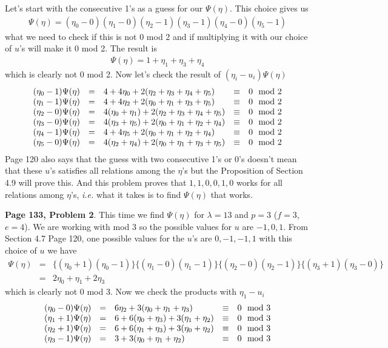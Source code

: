 \documentclass[aps,preprint,preprintnumbers,nofootinbib,showpacs,prd]{revtex4-1}
\newcommand{\ie}{{\it i.e.} }
\newcommand{\nbea}{\begin{eqnarray*}}
\newcommand{\neea}{\end{eqnarray*}}
\begin{document}
Let's start with the consecutive 1's as a guess for our $\Psi(\eta)$. This choice gives us 
%
\nbea
\Psi(\eta) = (\eta_0 - 0)(\eta_1 - 0)(\eta_2 - 1)(\eta_3 - 1)(\eta_4 - 0)(\eta_5 - 1)
\neea
%
what we need to check if this is not 0 mod 2 and if multiplying it with our choice of $u$'s will make it 0 mod 2. The result is
%
\nbea
\Psi(\eta) = 1 + \eta_1 + \eta_3 + \eta_4
\neea
%
which is clearly not 0 mod 2. Now let's check the result of $(\eta_i - u_i)\Psi(\eta)$
%
\nbea
\begin{array}{r c l c l}
(\eta_0 - 1)\Psi(\eta) & = & 4 + 4\eta_0 + 2(\eta_2 + \eta_3 + \eta_4 + \eta_5) & \equiv & 0 \mod{2} \\
(\eta_1 - 1)\Psi(\eta) & = & 4 + 4\eta_2 + 2(\eta_0 + \eta_1 + \eta_3 + \eta_5) & \equiv & 0 \mod{2} \\
(\eta_2 - 0)\Psi(\eta) & = & 4(\eta_0 + \eta_1) + 2(\eta_2 + \eta_3 + \eta_4 + \eta_5) & \equiv & 0 \mod{2} \\
(\eta_3 - 0)\Psi(\eta) & = & 4(\eta_3 + \eta_5) + 2(\eta_0 + \eta_1 + \eta_2 + \eta_4) & \equiv & 0 \mod{2} \\
(\eta_4 - 1)\Psi(\eta) & = & 4 + 4 \eta_5 + 2(\eta_0 + \eta_1 + \eta_2 + \eta_4) & \equiv & 0 \mod{2} \\
(\eta_5 - 0)\Psi(\eta) & = & 4(\eta_2 + \eta_4) + 2(\eta_0 + \eta_1 + \eta_3 + \eta_5) & \equiv & 0 \mod{2}
\end{array}
\neea
%
Page 120 also says that the guess with two consecutive 1's or 0's doesn't mean that these $u$'s satisfies all relations among the $\eta$'s but the Proposition of Section 4.9 will prove this. And this problem proves that $1,1,0,0,1,0$ works for all relations among $\eta$'s, \ie what it takes is to find $\Psi(\eta)$ that works.

{\bf Page 133, Problem 2}. This time we find $\Psi(\eta)$ for $\lambda = 13$ and $p = 3$ ($f = 3$, $e = 4$). We are working with mod 3 so the possible values for $u$ are $-1,0,1$. From Section 4.7 Page 120, one possible values for the $u$'s are $0,-1,-1,1$ with this choice of $u$ we have
%
\nbea
\Psi(\eta) & = & \{(\eta_0 + 1)(\eta_0 - 1)\}\{(\eta_1 - 0)(\eta_1 - 1)\}\{(\eta_2 - 0)(\eta_2 - 1)\}\{(\eta_3 + 1)(\eta_3 - 0)\} \\
& = & 2\eta_0 + \eta_1 + 2\eta_3
\neea
%
which is clearly not 0 mod 3. Now we check the products with $\eta_1 - u_i$
%
\nbea
\begin{array}{r c l c l}
(\eta_0 - 0)\Psi(\eta) & = & 6\eta_2 + 3(\eta_0 + \eta_1 + \eta_3) & \equiv & 0 \mod{3} \\
(\eta_1 + 1)\Psi(\eta) & = & 6 + 6(\eta_0 + \eta_3) + 3(\eta_1 + \eta_2) & \equiv & 0 \mod{3} \\
(\eta_2 + 1)\Psi(\eta) & = & 6 + 6(\eta_1 + \eta_3) + 3(\eta_0 + \eta_2) & \equiv & 0 \mod{3} \\
(\eta_3 - 1)\Psi(\eta) & = & 3 + 3(\eta_0 + \eta_1 + \eta_2) & \equiv & 0 \mod{3}
\end{array}
\neea
%
\end{document}
